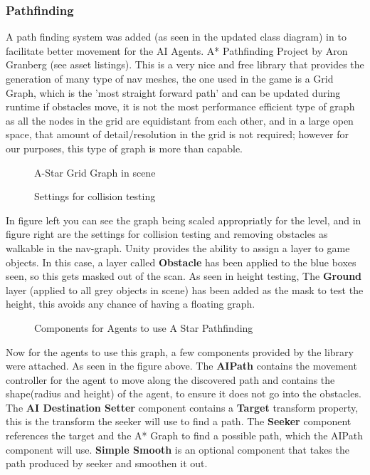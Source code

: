 \documentclass[11pt]{report}
\begin{document}
\subsubsection{Pathfinding}
A path finding system was added (as seen in the updated class diagram) in to facilitate better movement for the AI Agents. A* Pathfinding Project by Aron Granberg (see asset listings). This is a very nice and free library that provides the generation of many type of nav meshes, the one used in the game is a Grid Graph, which is the 'most straight forward path' and can be updated during runtime if obstacles move, it is not the most performance efficient type of graph as all the nodes in the grid are equidistant from each other, and in a large open space, that amount of detail/resolution in the grid is not required; however for our purposes, this type of graph is more than capable. 
\cite{astarPathfinding}
\begin{figure}[H]
    \begin{minipage}{.5\textwidth}
        \centering
        \caption{A-Star Grid Graph in scene}
    \end{minipage}
    \begin{minipage}{.5\textwidth}
        \centering
        \caption{Settings for collision testing}
    \end{minipage}
\end{figure}

In figure left you can see the graph being scaled appropriatly for the level, and in figure right are the settings for collision testing and removing obstacles as walkable in the nav-graph. Unity provides the ability to assign a layer to game objects. In this case, a layer called \textbf{Obstacle} has been applied to the blue boxes seen, so this gets masked out of the scan. As seen in height testing, The \textbf{Ground} layer (applied to all grey objects in scene) has been added as the mask to test the height, this avoids any chance of having a floating graph.

\begin{figure}[H]
    \centering
    \caption{Components for Agents to use A Star Pathfinding}
\end{figure}

Now for the agents to use this graph, a few components provided by the library were attached. As seen in the figure above. The \textbf{AIPath} contains the movement controller for the agent to move along the discovered path and contains the shape(radius and height) of the agent, to ensure it does not go into the obstacles. The \textbf{AI Destination Setter} component contains a \textbf{Target} transform property, this is the transform the seeker will use to find a path. The \textbf{Seeker} component references the target and the A* Graph to find a possible path, which the AIPath component will use. \textbf{Simple Smooth} is an optional component that takes the path produced by seeker and smoothen it out.
\end{document}
